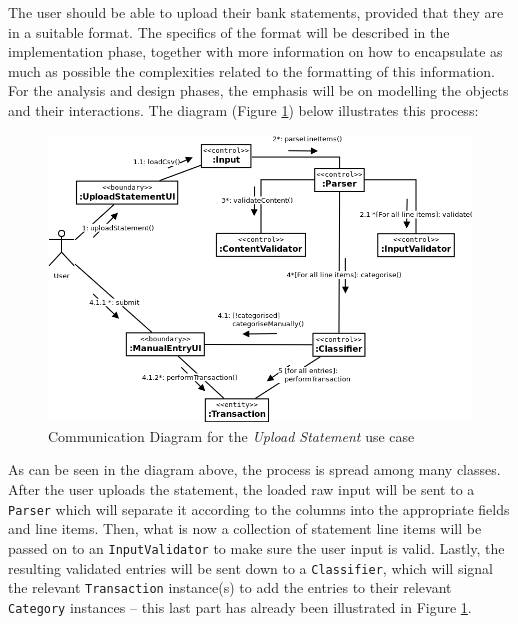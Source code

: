 The user should be able to upload their bank statements, provided that they are
in a suitable format. The specifics of the format will be described in the
implementation phase, together with more information on how to encapsulate as
much as possible the complexities related to the formatting of this
information.  For the analysis and design phases, the emphasis will be on
modelling the objects and their interactions. The diagram (Figure
\ref{fig:CommDiagram.CreateManualEntry}) below illustrates this process:
\begin{figure}[ht!]
  \begin{center}
    \includegraphics[width=14cm]{./contents/img/Comm_Diagram_-_Upload_Statement.png}
  \end{center}
  \caption{Communication Diagram for the \emph{Upload Statement} use case}
  \label{fig:CommDiagram.CreateManualEntry}
\end{figure}
\FloatBarrier

As can be seen in the diagram above, the process is spread among many classes.
After the user uploads the statement, the loaded raw input will be sent to a
\texttt{Parser} which will separate it according to the columns into the
appropriate fields and line items. Then, what is now a collection of statement
line items will be passed on to an \texttt{InputValidator} to make sure the user
input is valid. Lastly, the resulting validated entries will be sent down to a
\texttt{Classifier}, which will signal the relevant \texttt{Transaction}
instance(s) to add the entries to their relevant \texttt{Category} instances --
this last part has already been illustrated in Figure
\ref{fig:CommDiagram.CreateManualEntry}. 

